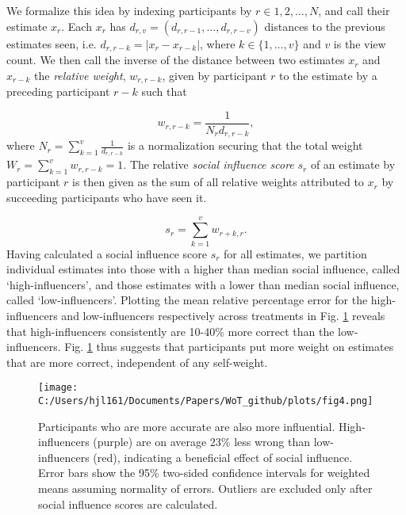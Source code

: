 \documentclass[9pt,twocolumn,twoside,lineno]{article}
\begin{document}
We formalize this idea by indexing participants by $r \in {1,2,...,N}$, and call their estimate $x_r$. Each $x_r$ has $d_{r,v} = (d_{r, r-1}, ..., d_{r, r-v})$ distances to the previous estimates seen, i.e. $d_{r, r-k} = |x_r-x_{r-k}|$, where $k \in \{1,...,v\}$ and $v$ is the view count. We then call the inverse of the distance between two estimates $x_r$ and $x_{r-k}$ the \textit{relative weight}, $w_{r,r-k}$, given by participant $r$ to the estimate by a preceding participant $r-k$ such that 

$$w_{r,r-k}=\frac{1}{N_rd_{r,r-k}},$$
where $N_r = \sum_{k=1}^v \frac{1}{d_{r,r-k}}$ is a normalization securing that the total weight $W_r = \sum_{k=1}^v w_{r,r-k} = 1$. The relative \textit{social influence score} $s_r$ of an estimate by participant $r$ is then given as the sum of all relative weights attributed to $x_r$ by succeeding participants who have seen it. 

$$s_r = \sum_{k=1}^v w_{r+k, r}.$$
Having calculated a social influence score $s_r$ for all estimates, we partition individual estimates into those with a higher than median social influence, called ‘high-influencers’, and those estimates with a lower than median social influence, called ‘low-influencers’. Plotting the mean relative percentage error for the high-influencers and low-influencers respectively across treatments in Fig. \ref{fig:4} reveals that high-influencers consistently are 10-40\% more correct than the low-influencers. Fig. \ref{fig:4} thus suggests that participants put more weight on estimates that are more correct, independent of any self-weight. 

\begin{figure}%
\centering
\texttt{[image: C:/Users/hjl161/Documents/Papers/WoT\_github/plots/fig4.png]}
\caption{Participants who are more accurate are also more influential. High-influencers (purple) are on average 23\% less wrong than low-influencers (red), indicating a beneficial effect of social influence. Error bars show the 95\% two-sided confidence intervals for weighted means assuming normality of errors. Outliers are excluded only after social influence scores are calculated.}\label{fig:4}
\end{figure}
\end{document}
